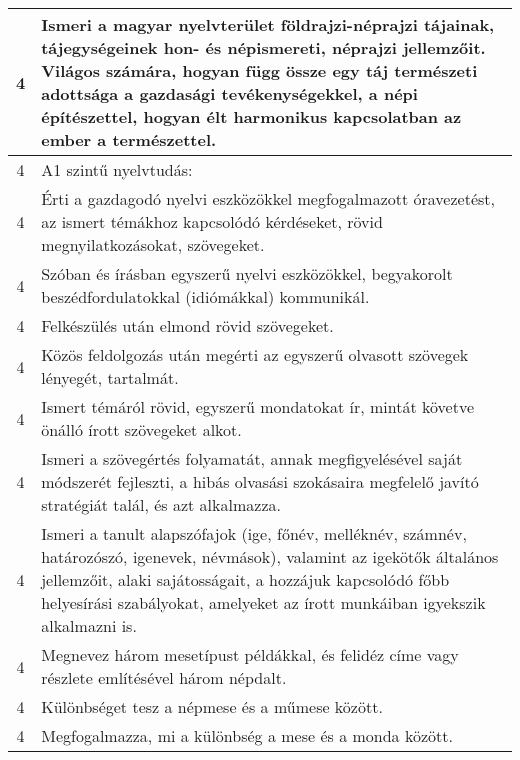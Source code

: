 \begin{longtable}{c | p{12cm} }
                                
                                          4 &  Ismeri a magyar nyelvterület földrajzi-néprajzi tájainak, tájegységeinek hon- és népismereti, néprajzi jellemzőit. Világos számára, hogyan függ össze egy táj természeti adottsága a gazdasági tevékenységekkel, a népi építészettel, hogyan élt harmonikus kapcsolatban az ember a természettel. \\ \hline
                                          4 &  A1 szintű nyelvtudás: \\ \hline
                                          4 &  Érti a gazdagodó nyelvi eszközökkel megfogalmazott óravezetést, az ismert témákhoz kapcsolódó kérdéseket, rövid megnyilatkozásokat, szövegeket. \\ \hline
                                          4 &  Szóban és írásban egyszerű nyelvi eszközökkel, begyakorolt beszédfordulatokkal (idiómákkal) kommunikál. \\ \hline
                                          4 &  Felkészülés után elmond rövid szövegeket. \\ \hline
                                          4 &  Közös feldolgozás után megérti az egyszerű olvasott szövegek lényegét, tartalmát. \\ \hline
                                          4 &  Ismert témáról rövid, egyszerű mondatokat ír, mintát követve önálló írott szövegeket alkot. \\ \hline
                                          4 &  Ismeri a szövegértés folyamatát, annak megfigyelésével saját módszerét fejleszti, a hibás olvasási szokásaira megfelelő javító stratégiát talál, és azt alkalmazza. \\ \hline
                                          4 &  Ismeri a tanult alapszófajok (ige, főnév, melléknév, számnév, határozószó, igenevek, névmások), valamint az igekötők általános jellemzőit, alaki sajátosságait, a hozzájuk kapcsolódó főbb helyesírási szabályokat, amelyeket az írott munkáiban igyekszik alkalmazni is. \\ \hline
                                          4 &  Megnevez három mesetípust példákkal, és felidéz címe vagy részlete említésével három népdalt. \\ \hline
                                          4 &  Különbséget tesz a népmese és a műmese között. \\ \hline
                                          4 &  Megfogalmazza, mi a különbség a mese és a monda között. \\ \hline

\end{longtable}
